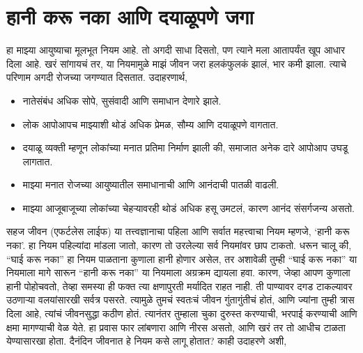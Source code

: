 \chapter{हानी करू नका आणि दयाळूपणे जगा}
हा माझ्या आयुष्याचा मूलभूत नियम आहे. तो अगदी साधा दिसतो, पण त्याने मला आतापर्यंत खूप आधार दिला आहे. खरं सांगायचं तर, या नियमामुळे माझं जीवन जरा हलकंफुलकं झालं, भार कमी झाला. त्याचे परिणाम अगदी रोजच्या जगण्यात दिसतात. उदाहरणार्थ, 
\begin{itemize}
 \item नातेसंबंध अधिक सोपे, सुसंवादी आणि समाधान देणारे झाले.
 \item लोक आपोआपच माझ्याशी थोडं अधिक प्रेमळ, सौम्य आणि दयाळूपणे वागतात.
 \item दयाळू व्यक्ती म्हणून लोकांच्या मनात प्रतिमा निर्माण झाली की, समाजात अनेक दारे आपोआप उघडू लागतात.
 \item माझ्या मनात रोजच्या आयुष्यातील समाधानाची आणि आनंदाची पातळी वाढली.
 \item माझ्या आजूबाजूच्या लोकांच्या चेहऱ्यावरही थोडं अधिक हसू उमटलं, कारण आनंद संसर्गजन्य असतो.
 \end{itemize}
सहज जीवन (एफर्टलेस लाईफ)  या तत्त्वज्ञानाचा पहिला आणि सर्वात महत्त्वाचा नियम म्हणजे,  ‘हानी करू नका’. हा नियम पहिल्यांदा मांडला जातो, कारण तो उरलेल्या सर्व नियमांवर छाप टाकतो. धरून चालू की, “घाई करू नका” हा नियम पाळताना कुणाला हानी होणार असेल, तर अशावेळी तुम्ही “घाई करू नका” या नियमाला मागे सारून “हानी करू नका” या नियमाला अग्रक्रम द्यायला हवा.
कारण, जेव्हा आपण कुणाला हानी पोहोचवतो, तेव्हा समस्या ही फक्त त्या क्षणापुरती मर्यादित राहत नाही. ती पाण्यावर दगड टाकल्यावर उठणाऱ्या वलयांसारखी सर्वत्र पसरते. त्यामुळे तुमचं स्वतःचं जीवन गुंतागुंतीचं होतं, आणि ज्यांना तुम्ही त्रास दिला आहे, त्यांचं जीवनसुद्धा कठीण होतं. त्यानंतर तुम्हाला चुका दुरुस्त करण्याची, भरपाई करण्याची आणि क्षमा मागण्याची वेळ येते. हा प्रवास फार लांबणारा आणि नीरस असतो, आणि खरं तर तो आधीच टाळता येण्यासारखा होता.
दैनंदिन जीवनात हे नियम कसे लागू होतात? काही उदाहरणे अशी, 
